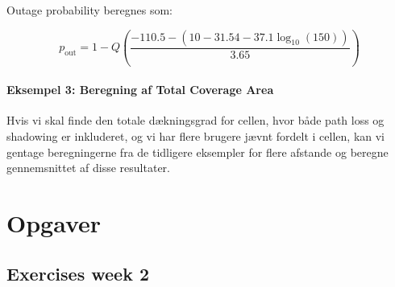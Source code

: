 \documentclass[a4paper,12pt]{book}
\begin{document}
	Outage probability beregnes som:
	
	\[
	p_{\text{out}} = 1 - Q\left(\frac{-110.5 - \left(10 - 31.54 - 37.1 \log_{10}(150)\right)}{3.65}\right)
	\]
	
	\subsubsection{Eksempel 3: Beregning af Total Coverage Area}
	
	Hvis vi skal finde den totale dækningsgrad for cellen, hvor både path loss og shadowing er inkluderet, og vi har flere brugere jævnt fordelt i cellen, kan vi gentage beregningerne fra de tidligere eksempler for flere afstande og beregne gennemsnittet af disse resultater.
	
	\chapter{Opgaver}
	\section{Exercises week 2}
	
\end{document}
